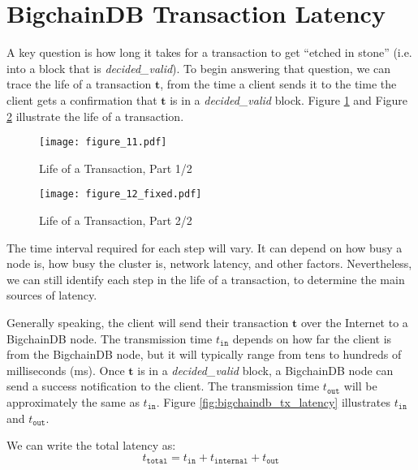 \section{BigchainDB Transaction Latency}\label{sec:latency}

A key question is how long it takes for a transaction to get “etched in stone” (i.e. into a block that is \textsf{\textit{decided\_valid}}). 
To begin answering that question, we can trace the life of a transaction $\mathbf{t}$, from the time a client sends it to the time the client gets a confirmation that $\mathbf{t}$ is in a \textsf{\textit{decided\_valid}} block. 
Figure \ref{fig:bigchaindb_tx_life_1} and Figure \ref{fig:bigchaindb_tx_life_2} illustrate the life of a transaction.

\begin{figure}[!ht]
  \centering
  \texttt{[image: figure\_11.pdf]}
  \caption{Life of a Transaction, Part 1/2}
  \label{fig:bigchaindb_tx_life_1}
\end{figure}

\begin{figure}[!ht]
  \centering
  \texttt{[image: figure\_12\_fixed.pdf]}
  \caption{Life of a Transaction, Part 2/2}
  \label{fig:bigchaindb_tx_life_2}
\end{figure}

The time interval required for each step will vary. 
It can depend on how busy a node is, how busy the cluster is, network latency, and other factors. 
Nevertheless, we can still identify each step in the life of a transaction, to determine the main sources of latency.

Generally speaking, the client will send their transaction $\mathbf{t}$ over the Internet to a BigchainDB node. 
The transmission time $t_{\mathtt{in}}$ depends on how far the client is from the BigchainDB node, but it will typically range from tens to hundreds of milliseconds (ms). 
Once $\mathbf{t}$ is in a \textsf{\textit{decided\_valid}} block, a BigchainDB node can send a success notification to the client. 
The transmission time $t_{\mathtt{out}}$ will be approximately the same as $t_{\mathtt{in}}$. 
Figure \ref{fig:bigchaindb_tx_latency} illustrates $t_{\mathtt{in}}$ and $t_{\mathtt{out}}$.

We can write the total latency as:
\begin{equation}
  t_\mathtt{total} = t_{\mathtt{in}} + t_{\mathtt{internal}} + t_{\mathtt{out}}
\end{equation}

